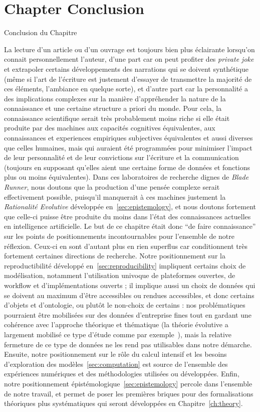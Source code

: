 


\newpage


\section*{Chapter Conclusion}{Conclusion du Chapitre}


La lecture d'un article ou d'un ouvrage est toujours bien plus éclairante lorsqu'on connait personnellement l'auteur, d'une part car on peut profiter des \emph{private joke} et extrapoler certains développements des narrations qui se doivent synthétique (même si l'art de l'écriture est justement d'essayer de transmettre la majorité de ces éléments, l'ambiance en quelque sorte), et d'autre part car la personnalité a des implications complexes sur la manière d'appréhender la nature de la connaissance et une certaine structure a priori du monde. Pour cela, la connaissance scientifique serait très probablement moins riche si elle était produite par des machines aux capacités cognitives équivalentes, aux connaissances et experiences empiriques subjectives équivalentes et aussi diverses que celles humaines, mais qui auraient été programmées pour minimiser l'impact de leur personnalité et de leur convictions sur l'écriture et la communication (toujours en supposant qu'elles aient une certaine forme de données et fonctions plus ou moins équivalentes). Dans ces laboratoires de recherche dignes de \emph{Blade Runner}, nous doutons que la production d'une pensée complexe serait effectivement possible, puisqu'il manquerait à ces machines justement la \emph{Rationalité Evolutive} développée en~\ref{sec:epistemology}, et nous doutons fortement que celle-ci puisse être produite du moins dans l'état des connaissances actuelles en intelligence artificielle. Le but de ce chapitre était donc ``de faire connaissance'' sur les points de positionnements incontournables pour l'ensemble de notre réflexion. Ceux-ci en sont d'autant plus en rien superflus car conditionnent très fortement certaines directions de recherche. Notre positionnement sur la reproductibilité développé en~\ref{sec:reproducibility} impliquent certains choix de modélisation, notamment l'utilisation univoque de plateformes ouvertes, de workflow et d'implémentations ouverts ; il implique aussi un choix de données qui se doivent au maximum d'être accessibles ou rendues accessibles, et donc certains d'objets et d'ontologie, ou plutôt le non-choix de certains : nos problématiques pourraient être mobilisées sur des données d'entreprise fines tout en gardant une cohérence avec l'approche théorique et thématique (la théorie évolutive a largement mobilisé ce type d'étude comme par exemple~\cite{paulus2004coevolution}), mais la relative fermeture de ce type de données ne les rend pas utilisables dans notre démarche. Ensuite, notre positionnement sur le rôle du calcul intensif et les besoins d'exploration des modèles~\ref{sec:computation} est source de l'ensemble des expériences numériques et des méthodologies utilisées ou développées. Enfin, notre positionnement épistémologique~\ref{sec:epistemology} percole dans l'ensemble de notre travail, et permet de poser les premières briques pour des formalisations théoriques plus systématiques qui seront développées en Chapitre~\ref{ch:theory}.


